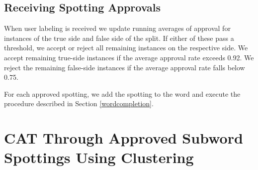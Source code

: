 \documentclass[ms,electronic,twosidetoc,letterpaper,chaptercenter,parttop,lof,lot]{byumsphd}
\begin{document}
%
%

\subsection{Receiving Spotting Approvals}

When user labeling is received we update running averages of approval for instances of the true side and false side of the split. If either of these pass a threshold, we accept or reject all remaining instances on the respective side. We accept remaining true-side instances if the average approval rate exceeds 0.92. We reject the remaining false-side instances if the average approval rate falls below 0.75.

For each approved spotting, we add the spotting to the word and execute the procedure described in Section \ref{wordcompletion}.










\section{CAT Through Approved Subword Spottings Using Clustering}
\end{document}
